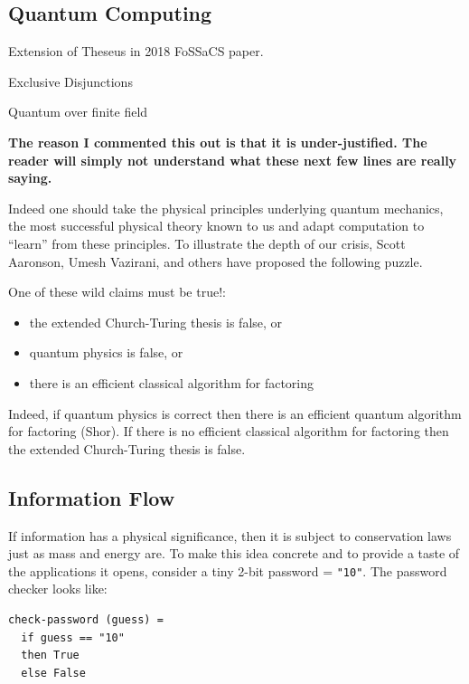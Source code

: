 \documentclass{article}
\newcommand{\jc}[1]{\fbox{Jacques says:} \textbf{#1}}
\begin{document}
\subsection{Quantum Computing} 
 
Extension of Theseus in 2018 FoSSaCS paper.

Exclusive Disjunctions

Quantum over finite field

\jc{The reason I commented this out is that it is under-justified. The
reader will simply not understand what these next few lines are really
saying.}

Indeed one should take the physical principles underlying quantum
mechanics, the most successful physical theory known to us and adapt
computation to ``learn'' from these principles. To illustrate the
depth of our crisis, Scott Aaronson, Umesh Vazirani, and others have
proposed the following puzzle.

One of these wild claims must be true!:
\begin{itemize}
\item the extended Church-Turing thesis is false, or
\item quantum physics is false, or
\item there is an efficient classical algorithm for factoring
\end{itemize}
Indeed, if quantum physics is correct then there is an efficient quantum
algorithm for factoring (Shor). If there is no efficient classical algorithm
for factoring then the extended Church-Turing thesis is false.

\subsection{Information Flow} 
 
If information has a physical significance, then it is subject to
conservation laws just as mass and energy are.  To make this idea
concrete and to provide a taste of the applications it opens, consider
a tiny 2-bit password = \verb|"10"|. The password checker looks like:

\begin{verbatim}
check-password (guess) =
  if guess == "10"
  then True
  else False
\end{verbatim}
\end{document}
